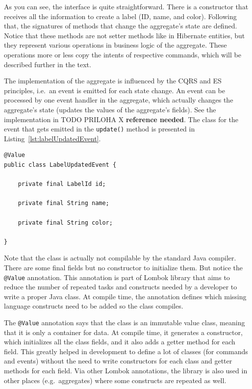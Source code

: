 \documentclass{book}
\begin{document}
As you can see, the interface is quite straightforward. There is a
constructor that receives all the information to create a label (ID,
name, and color). Following that, the signatures of methods that change
the aggregate's state are defined. Notice that these methods are not
setter methods like in Hibernate entities, but they represent various
operations in business logic of the aggregate. These operations more or
less copy the intents of respective commands, which will be described
further in the text.

The implementation of the aggregate is influenced by the CQRS and ES
principles, i.e.~an event is emitted for each state change. An event can
be processed by one event handler in the aggregate, which actually
changes the aggregate's state (updates the values of the aggregate's
fields). See the implementation in TODO PRILOHA X \textbf{reference needed}.
The class for the event that gets emitted in the \texttt{update()}
method is presented in Listing~\ref{lst:labelUpdatedEvent}.

\begin{lstlisting}[caption={The \texttt{LabelUpdatedEvent} class},label={lst:labelUpdatedEvent},captionpos=b,float,floatplacement=H]
@Value
public class LabelUpdatedEvent {

    private final LabelId id;

    private final String name;

    private final String color;

}
\end{lstlisting}

Note that the class is actually not compilable by the standard Java
compiler. There are some final fields but no constructor to initialize
them. But notice the \texttt{@Value} annotation. This annotation is part
of Lombok library \cite{lombok} that aims to reduce the number of
repeated tasks and constructs needed by a developer to write a proper
Java class. At compile time, the annotation defines which missing
language constructs need to be added so the class compiles.

The \texttt{@Value} annotation says that the class is an immutable value
class, meaning that it is only a container for data. At compile time, it
generates a constructor, which initializes all the class fields, and it
also adds a getter method for each field. This greatly helped in
development to define a lot of classes (for commands and events) without
the need to write constructors for each class and getter methods for
each field. Via other Lombok annotations, the library is also used in
other places (e.g.~aggregates) where some constructs are repeated as
well.
\end{document}
